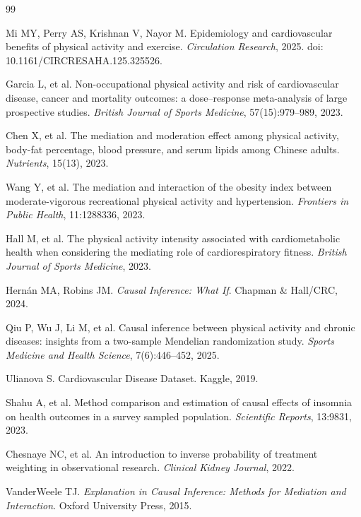 \documentclass[12pt,a4paper]{article}
\begin{document}
\begin{thebibliography}{99}

Mi MY, Perry AS, Krishnan V, Nayor M.
Epidemiology and cardiovascular benefits of physical activity and exercise.
\textit{Circulation Research}, 2025. doi: 10.1161/CIRCRESAHA.125.325526.

Garcia L, et al.
Non-occupational physical activity and risk of cardiovascular disease, cancer and mortality outcomes: a dose--response meta-analysis of large prospective studies.
\textit{British Journal of Sports Medicine}, 57(15):979--989, 2023.

Chen X, et al.
The mediation and moderation effect among physical activity, body-fat percentage, blood pressure, and serum lipids among Chinese adults.
\textit{Nutrients}, 15(13), 2023.

Wang Y, et al.
The mediation and interaction of the obesity index between moderate-vigorous recreational physical activity and hypertension.
\textit{Frontiers in Public Health}, 11:1288336, 2023.

Hall M, et al.
The physical activity intensity associated with cardiometabolic health when considering the mediating role of cardiorespiratory fitness.
\textit{British Journal of Sports Medicine}, 2023.

Hern\'an MA, Robins JM.
\textit{Causal Inference: What If}. Chapman \& Hall/CRC, 2024.

Qiu P, Wu J, Li M, et al.
Causal inference between physical activity and chronic diseases: insights from a two-sample Mendelian randomization study.
\textit{Sports Medicine and Health Science}, 7(6):446--452, 2025.

Ulianova S.
Cardiovascular Disease Dataset. Kaggle, 2019.

Shahu A, et al.
Method comparison and estimation of causal effects of insomnia on health outcomes in a survey sampled population.
\textit{Scientific Reports}, 13:9831, 2023.

Chesnaye NC, et al.
An introduction to inverse probability of treatment weighting in observational research.
\textit{Clinical Kidney Journal}, 2022.

VanderWeele TJ.
\textit{Explanation in Causal Inference: Methods for Mediation and Interaction}. Oxford University Press, 2015.


\end{thebibliography}
\end{document}
